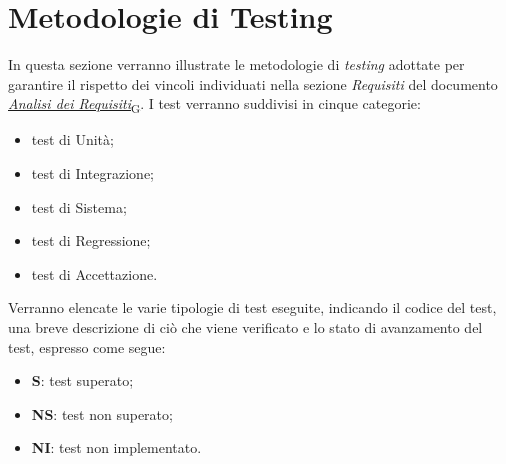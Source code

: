 \section{Metodologie di Testing}
In questa sezione verranno illustrate le metodologie di \textit{testing} adottate per garantire il rispetto dei vincoli individuati
nella sezione \textit{Requisiti} del documento \href{https://7last.github.io/docs/rtb/documentazione-esterna/analisi-dei-requisiti}{\href{https://7last.github.io/docs/rtb/documentazione-interna/glossario\#analisi-dei-requisiti}{\textit{Analisi dei Requisiti}\textsubscript{G}}}.
I test verranno suddivisi in cinque categorie:
\begin{itemize}
    \item test di Unità;
    \item test di Integrazione;
    \item test di Sistema;
    \item test di Regressione;
    \item test di Accettazione.
\end{itemize}

Verranno elencate le varie tipologie di test eseguite, indicando il codice del test, una breve descrizione di ciò che viene verificato e lo stato di avanzamento del test, espresso come segue:
\begin{itemize}
	\item \textbf{S}: test superato;
	\item \textbf{NS}: test non superato;
	\item \textbf{NI}: test non implementato.
\end{itemize}

